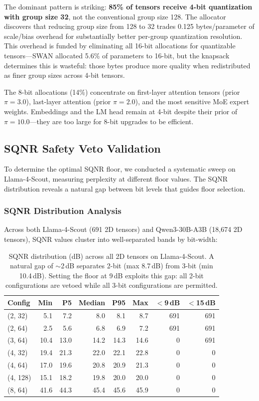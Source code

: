 \documentclass{article}
\begin{document}
The dominant pattern is striking: \textbf{85\% of tensors receive 4-bit quantization with group size 32}, not the conventional group size 128. The allocator discovers that reducing group size from 128 to 32 trades 0.125 bytes/parameter of scale/bias overhead for substantially better per-group quantization resolution. This overhead is funded by eliminating all 16-bit allocations for quantizable tensors---SWAN allocated 5.6\% of parameters to 16-bit, but the knapsack determines this is wasteful: those bytes produce more quality when redistributed as finer group sizes across 4-bit tensors.

The 8-bit allocations (14\%) concentrate on first-layer attention tensors (prior $\pi = 3.0$), last-layer attention (prior $\pi = 2.0$), and the most sensitive MoE expert weights. Embeddings and the LM head remain at 4-bit despite their prior of $\pi = 10.0$---they are too large for 8-bit upgrades to be efficient.

\subsection{SQNR Safety Veto Validation}
\label{sec:sqnr_validation}

To determine the optimal SQNR floor, we conducted a systematic sweep on Llama-4-Scout, measuring perplexity at different floor values. The SQNR distribution reveals a natural gap between bit levels that guides floor selection.

\subsubsection{SQNR Distribution Analysis}

Across both Llama-4-Scout (691 2D tensors) and Qwen3-30B-A3B (18{,}674 2D tensors), SQNR values cluster into well-separated bands by bit-width:

\begin{table}[h]
\centering
\caption{SQNR distribution (dB) across all 2D tensors on Llama-4-Scout. A natural gap of ${\sim}$2\,dB separates 2-bit (max 8.7\,dB) from 3-bit (min 10.4\,dB). Setting the floor at 9\,dB exploits this gap: all 2-bit configurations are vetoed while all 3-bit configurations are permitted.}
\label{tab:sqnr_dist}
\begin{tabular}{lrrrrrrr}
\toprule
Config & Min & P5 & Median & P95 & Max & $<$9\,dB & $<$15\,dB \\
\midrule
(2, 32) & 5.1 & 7.2 & 8.0 & 8.1 & 8.7 & 691 & 691 \\
(2, 64) & 2.5 & 5.6 & 6.8 & 6.9 & 7.2 & 691 & 691 \\
(3, 64) & 10.4 & 13.0 & 14.2 & 14.3 & 14.6 & 0 & 691 \\
(4, 32) & 19.4 & 21.3 & 22.0 & 22.1 & 22.8 & 0 & 0 \\
(4, 64) & 17.0 & 19.6 & 20.8 & 20.9 & 21.3 & 0 & 0 \\
(4, 128) & 15.1 & 18.2 & 19.8 & 20.0 & 20.0 & 0 & 0 \\
(8, 64) & 41.6 & 44.3 & 45.4 & 45.6 & 45.9 & 0 & 0 \\
\bottomrule
\end{tabular}
\end{table}
\end{document}
